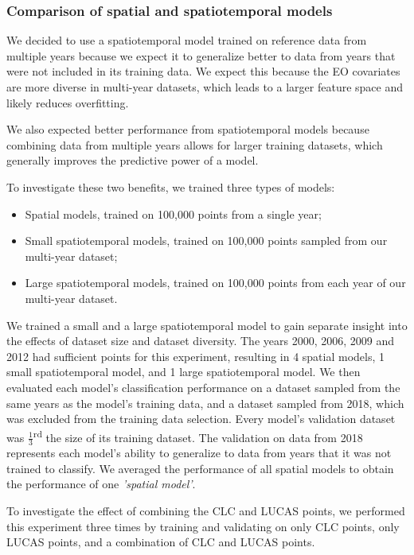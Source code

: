     \subsubsection*{Comparison of spatial and spatiotemporal models}
    
        We decided to use a spatiotemporal model trained on reference data from multiple years because we expect it to generalize better to data from years that were not included in its training data. We expect this because the EO covariates are more diverse in multi-year datasets, which leads to a larger feature space and likely reduces overfitting. 
        
        We also expected better performance from spatiotemporal models because combining data from multiple years allows for larger training datasets, which generally improves the predictive power of a model.
        
        To investigate these two benefits, we trained three types of models:
        \begin{itemize}
        \item Spatial models, trained on 100,000 points from a single year;
        \item Small spatiotemporal models, trained on 100,000 points sampled from our multi-year dataset;
        \item Large spatiotemporal models, trained on 100,000 points from each year of our multi-year dataset.
        \end{itemize}
        We trained a small and a large spatiotemporal model to gain separate insight into the effects of dataset size and dataset diversity. The years 2000, 2006, 2009 and 2012 had sufficient points for this experiment, resulting in 4 spatial models, 1 small spatiotemporal model, and 1 large spatiotemporal model. We then evaluated each model's classification performance on a dataset sampled from the same years as the model's training data, and a dataset sampled from 2018, which was excluded from the training data selection. Every model's validation dataset was $\frac{1}{3}$\textsuperscript{rd} the size of its training dataset. The validation on data from 2018 represents each model's ability to generalize to data from years that it was not trained to classify. We averaged the performance of all spatial models to obtain the performance of one \emph{'spatial model'}.
        
        To investigate the effect of combining the CLC and LUCAS points, we performed this experiment three times by training and validating on only CLC points, only LUCAS points, and a combination of CLC and LUCAS points.

